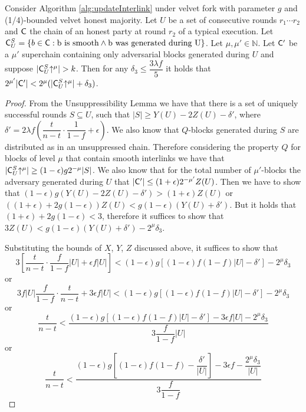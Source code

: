 \begin{lemma}\label{lem:claim3_lemma}
   Consider Algorithm \ref{alg:updateInterlink} under velvet fork with parameter $g$ and (1/4)-bounded velvet honest majority. Let $U$ be a set of consecutive rounds $r_1 \cdots r_2$ and $\mathsf{C}$ the chain of an honest party at round $r_2$ of a typical execution. Let $\mathsf{C}^S_U = \{b \in \mathsf{C}: \text{b is smooth} \land \text{b was generated during U} \}$. Let $\mu, \mu' \in \mathbb{N}$.
   Let $\mathsf{C}'$ be a $\mu'$ superchain containing only adversarial blocks generated during $U$ and suppose $\lvert \mathsf{C}^S_U\negthickspace\uparrow^{\mu} \rvert > k$. Then for any $\delta_3 \leq \dfrac{3\lambda f}{5} $ it holds that
   $2^{\mu'}\lvert \mathsf{C}' \rvert < 2^{\mu} ( \lvert \mathsf{C}^S_U\negthickspace\uparrow^{\mu} \rvert + \delta_3 )$.
\end{lemma}
\begin{proof}
  From the Unsuppressibility Lemma we have that there is a set of uniquely
  successful rounds $S \subseteq U$, such that
  $\lvert S \rvert \geq Y(U) - 2Z(U) - \delta'$, where
  $\delta' = 2 \lambda f (\dfrac{t}{n-t} \cdot \dfrac{1}{1-f} + \epsilon)$.
  We also know that $Q$-blocks generated during $S$ are distributed as in an
  unsuppressed chain. Therefore considering the property $Q$ for blocks of
  level $\mu$ that contain smooth interlinks we have that
  $\lvert \mathsf{C}^S_U\negthickspace\uparrow^{\mu} \rvert \geq (1-\epsilon)g2^{-\mu} \lvert S \rvert$.
  We also know that for the total number of $\mu'$-blocks the adversary
  generated during $U$ that
  $\lvert \mathsf{C}' \rvert \leq (1+\epsilon)2^{-\mu'}Z(U)$.
  Then we have to show that
  $(1-\epsilon)g (Y(U) - 2Z(U) - \delta' ) > (1+\epsilon)Z(U)$ or
  $((1+\epsilon)+2g(1-\epsilon))Z(U) < g(1-\epsilon)(Y(U) + \delta')$.
  But it holds that $ (1+\epsilon)+2g(1-\epsilon) < 3$, therefore it suffices to show that
  $3Z(U) < g(1-\epsilon)(Y(U) + \delta') - 2^\mu \delta_3$.

Substituting the bounds of $X$, $Y$, $Z$ discussed above, it suffices to show that
\begin{equation*}
    3[\dfrac{t}{n-t} \cdot \dfrac{f}{1-f} \lvert U \rvert + \epsilon f \lvert U \rvert ] < (1- \epsilon)g[ (1-\epsilon)f(1-f) \lvert U \rvert - \delta'] - 2^\mu \delta_3
\end{equation*} or
\begin{equation*}
        3f \lvert U \rvert \dfrac{f}{1-f}\cdot \dfrac{t}{n-t} + 3 \epsilon f \lvert U \rvert < (1- \epsilon)g[ (1-\epsilon)f(1-f) \lvert U \rvert - \delta'] -2^\mu \delta_3
\end{equation*} or
\begin{equation*}
        \dfrac{t}{n-t} < \dfrac{ (1- \epsilon)g[ (1-\epsilon)f(1-f) \lvert U \rvert - \delta' ] - 3\epsilon f \lvert U \rvert -2^\mu \delta_3 }  { 3 \dfrac{f}{1-f} \lvert U \rvert}
\end{equation*} or
\begin{equation*}
    \dfrac{t}{n-t} < \dfrac{  (1- \epsilon)g[ (1-\epsilon)f(1-f) - \dfrac{\delta'}{\lvert U \rvert} ] - 3 \epsilon f - \dfrac{2^\mu \delta_3}{\lvert U \rvert} }  { 3\dfrac{f}{1-f}}
\end{equation*}


\end{proof}
